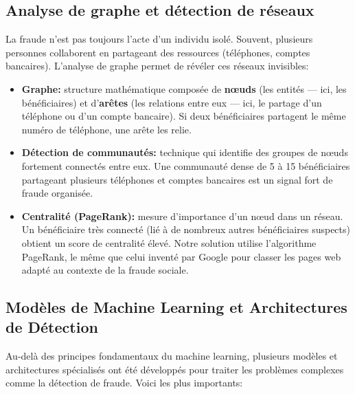 \documentclass[a4paper, oneside, 12pt]{book}
\begin{document}

\subsection{Analyse de graphe et détection de réseaux}

\hspace{0.5cm}La fraude n'est pas toujours l'acte d'un individu isolé. Souvent, plusieurs personnes collaborent en partageant des ressources (téléphones, comptes bancaires). L'analyse de graphe permet de révéler ces réseaux invisibles:

\begin{itemize}[label=\textbullet]

    \item \textbf{Graphe:} structure mathématique composée de \textbf{nœuds} (les entités — ici, les bénéficiaires) et d'\textbf{arêtes} (les relations entre eux — ici, le partage d'un téléphone ou d'un compte bancaire). Si deux bénéficiaires partagent le même numéro de téléphone, une arête les relie.

    \item \textbf{Détection de communautés:} technique qui identifie des groupes de nœuds fortement connectés entre eux. Une communauté dense de 5 à 15 bénéficiaires partageant plusieurs téléphones et comptes bancaires est un signal fort de fraude organisée.

    \item \textbf{Centralité (PageRank):} mesure d'importance d'un nœud dans un réseau. Un bénéficiaire très connecté (lié à de nombreux autres bénéficiaires suspects) obtient un score de centralité élevé. Notre solution utilise l'algorithme PageRank, le même que celui inventé par Google pour classer les pages web adapté au contexte de la fraude sociale.

\end{itemize}

\subsection{Modèles de Machine Learning et Architectures de Détection}

\hspace{0.5cm}Au-delà des principes fondamentaux du machine learning, plusieurs 
modèles et architectures spécialisés ont été développés pour traiter les problèmes 
complexes comme la détection de fraude. Voici les plus importants:
\end{document}
